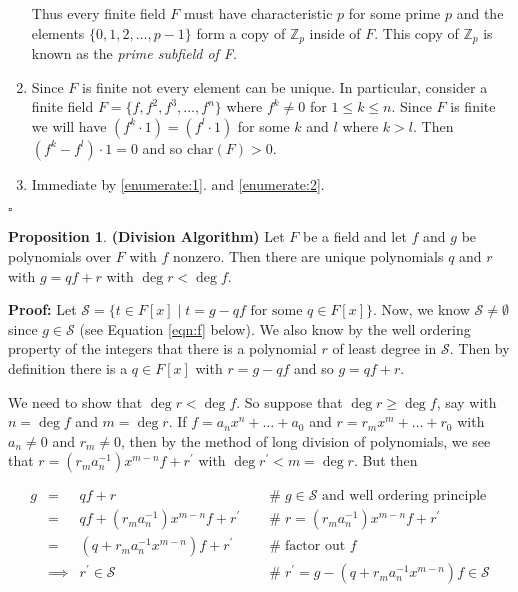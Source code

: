 \documentclass[11pt, oneside]{article}   	%
\theoremstyle{definition}
\newtheorem{proposition}{Proposition}[section]
\begin{document}
\begin{enumerate}
Thus every finite field $F$ must have characteristic $p$ for some prime $p$ and the elements $\{0,1,2,\hdots,p-1\}$ form a copy of 
$\mathbb{Z}_p$ inside of $F$. This copy of $\mathbb{Z}_p$ is known as the \emph{prime subfield of F}.



\item Since $F$ is finite not every element can be unique. In particular,  consider a finite field $F = \{f, f^2, f^3, \hdots, f^n\}$  where 
$f^k \neq 0$ for $1 \leq k \leq n$.  Since $F$ is finite we will have $(f^k \cdot 1) = (f^l \cdot 1)$ for some $k$ and $l$ where $k > l$. 
Then $(f^k -  f^l ) \cdot 1  = 0$ and so $\text{char}(F) > 0$.
\label{enumerate:2}

\item Immediate by \ref{enumerate:1}. and \ref{enumerate:2}.
\end{enumerate}
\noindent
$\square$



\begin{proposition} \textbf{(Division Algorithm)}
Let $F$ be a field and let $f$ and $g$ be polynomials over $F$ with $f$ nonzero. Then there are unique polynomials $q$ and $r$ with $g = qf + r$
with $\deg r  < \deg f$.
\end{proposition}

\noindent
\textbf{Proof:}  Let $\mathcal{S} = \{t \in F[x] \mid t = g - qf \text{ for 
some } q \in F[x] \}$. Now, we know $\mathcal{S} \neq \emptyset$
since $g \in \mathcal{S}$ (see Equation \ref{eqn:f} below). We also know by the well ordering property
of the integers \cite{well_ordering_principle} that there is a polynomial $r$ of least degree in $\mathcal{S}$. Then
by definition there is a $q \in F[x]$ with $r = g - qf$ and so $g = qf +r$. 

\bigskip
\noindent
We need to show that $\deg r < \deg f$. So suppose that $\deg r \geq \deg f$, say with  $n = \deg f$ and $m = \deg r$. 
If $f = a_nx^n + \hdots +a_0$ and
$r = r_mx^m + \hdots +r_0$ with $a_n \neq 0$ and $r_m \neq 0$, then by the method of
long division of polynomials, we see that $r = (r_m a_n^{-1})x^{m - n} f + r^\prime$ with  $\deg r^\prime < m = \deg r$. But then 


\begin{equation*}
\begin{array}{rcll}
g
&=& qf + r                                                                  &\quad  \mathrel{\#} g \in \mathcal{S} \text{ and well ordering principle} \\
&=& qf + (r_m a_n^{-1}) x^{m - n}f + r^\prime           &\quad  \mathrel{\#}  r = (r_m a_n^{-1})x^{m - n} f + r^\prime \\
&=& (q + r_m a_n^{-1} x^{m - n}) f + r^\prime           &\quad  \mathrel{\#} \text{factor out $f$} \\
&\implies& r^\prime \in \mathcal{S}                           &\quad  \mathrel{\#} r^\prime = g - (q + r_m a_n^{-1} x^{m - n}) f \in \mathcal{S}
\end{array}
\end{equation*}
\end{document}
